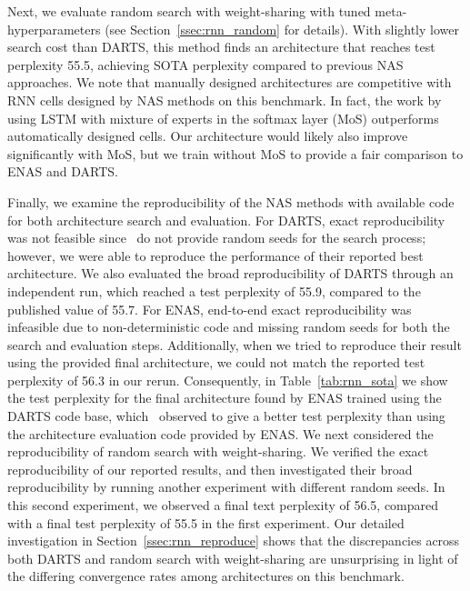 \documentclass[acmlarge, nonacm]{acmart}
\begin{document}
Next, 
we evaluate random search with weight-sharing with tuned meta-hyperparameters (see Section~\ref{ssec:rnn_random} for details).
With slightly lower search cost than DARTS, this method 
finds an architecture that reaches test perplexity 55.5, achieving SOTA perplexity compared to previous NAS approaches.  
We note that manually designed architectures are competitive with RNN cells designed by NAS methods on this benchmark.  In fact, the work by \citet{yang2018breaking} using LSTM with mixture of experts in the softmax layer (MoS)  outperforms automatically designed cells.  Our architecture would likely also improve significantly with MoS, but we train without MoS to provide a fair comparison to ENAS and DARTS.  

Finally, we examine the reproducibility of the NAS methods with available code for both architecture search and evaluation. For DARTS, exact reproducibility was not feasible since~\citet{liu2018darts} do not provide random seeds for the search process; however, we were able to reproduce the performance of their reported best architecture.  We also evaluated the broad reproducibility of DARTS through an independent run, which reached a test perplexity of 55.9, 
compared to the published value of 55.7.  For ENAS, end-to-end exact reproducibility was infeasible due to non-deterministic code and missing random seeds for both the search and evaluation steps.  Additionally, when we tried to reproduce their result using the provided final architecture, we could not match the reported test perplexity of 56.3 in our rerun.  Consequently, in Table~\ref{tab:rnn_sota} we  show the test perplexity for the final architecture found by ENAS trained using the DARTS code base, which~\citet{liu2018darts} observed to give a better test perplexity than using the architecture evaluation code provided by ENAS.
We next considered the reproducibility of random search with weight-sharing. We verified the exact reproducibility of our reported results, and then investigated their broad reproducibility by running another experiment with different random seeds.  In this second experiment, we observed a final text perplexity of 56.5, compared with a final test perplexity of 55.5 in the first experiment.
Our detailed investigation in Section~\ref{ssec:rnn_reproduce} shows that the discrepancies across both DARTS and random search with weight-sharing are unsurprising in light of the differing convergence rates among architectures on this benchmark.
\end{document}
